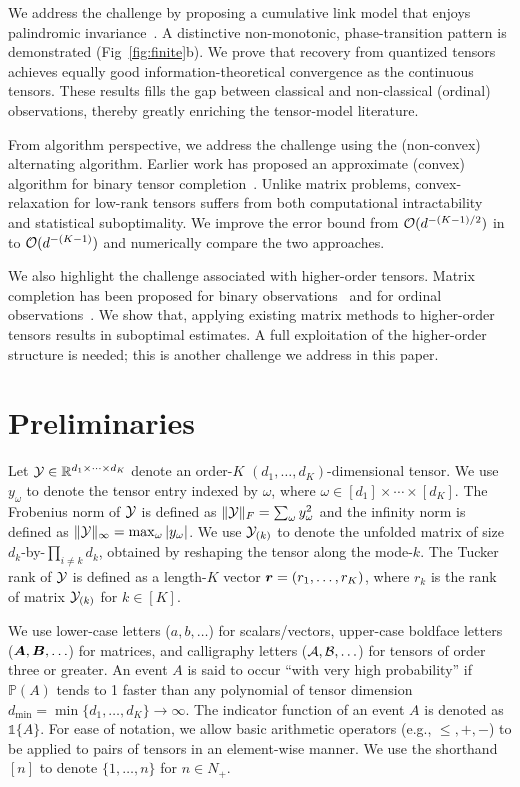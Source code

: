 \documentclass{article}
\theoremstyle{plain}
\theoremstyle{definition}
\begin{document}
We address the challenge by proposing a cumulative link model that enjoys palindromic invariance~\cite{mccullagh1980regression}. A distinctive non-monotonic, phase-transition pattern is demonstrated (Fig~\ref{fig:finite}b). We prove that recovery from quantized tensors achieves equally good information-theoretical convergence as the continuous tensors. These results fills the gap between classical and non-classical (ordinal) observations, thereby greatly enriching the tensor-model literature. 

From algorithm perspective, we address the challenge using the (non-convex) alternating algorithm. Earlier work has proposed an approximate (convex) algorithm for binary tensor completion~\cite{ghadermarzy2018learning}. Unlike matrix problems, convex-relaxation for low-rank tensors suffers from both computational intractability~\cite{hillar2013most} and statistical suboptimality. We improve the error bound from $\mathcal{O}(d^{-(K-1)/2})$ in~\citet{ghadermarzy2018learning} to $\mathcal{O}(d^{-(K-1)})$ and numerically compare the two approaches. 

We also highlight the challenge associated with higher-order tensors. Matrix completion has been proposed for binary observations~\cite{cai2013max,davenport2014,bhaskar20151} and for ordinal observations~\cite{bhaskar2016probabilistic}. We show that, applying existing matrix methods to higher-order tensors results in suboptimal estimates. A full exploitation of the higher-order structure is needed; this is another challenge we address in this paper. 


\section{Preliminaries}
Let $\mathcal{Y}\in\mathbb{R}^{d_1\times \cdots \times d_K}$ denote an order-$K$ $(d_1,\ldots,d_K)$-dimensional tensor. We use $y_\omega$ to denote the tensor entry indexed by $\omega$, where $\omega\in[d_1]\times\cdots\times[d_K]$.  The Frobenius norm of $\mathcal{Y}$ is defined as $\lVert\mathcal{Y}\rVert_F=\sum_\omega y^2_\omega$ and the infinity norm is defined as $\lVert\mathcal{Y}\rVert_\infty=\max_{\omega}|y_\omega|$. We use $\mathcal{Y}_{(k)}$ to denote the unfolded matrix of size $d_k$-by-$\prod_{i\neq k}d_k$, obtained by reshaping the tensor along the mode-$k$. The Tucker rank of $\mathcal{Y}$ is defined as a length-$K$ vector $\bm{r} = (r_1,\ldots,r_K)$, where $r_k$ is the rank of matrix $\mathcal{Y}_{(k)}$ for $k \in[K]$.  

We use lower-case letters ($a, b, \ldots$) for scalars/vectors, upper-case boldface letters ($\bm A, \bm B,  \ldots$) for matrices, and calligraphy letters ($\mathcal{A},\mathcal{B},\ldots$) for tensors of order three or greater.  An event $A$ is said to occur ``with very high probability'' if $\mathbb{P}(A)$ tends to 1 faster than any polynomial of tensor dimension $d_{\min}=\min\{d_1,\ldots,d_K\} \to\infty$. The indicator function of an event $A$ is denoted as $\mathds{1}\{A\}$. For ease of notation, we allow basic arithmetic operators (e.g., $\leq, +, -$) to be applied to pairs of tensors in an element-wise manner. We use the shorthand $[n]$ to denote $\{1,\ldots,n\}$ for $n \in N_{+}$.
\end{document}
